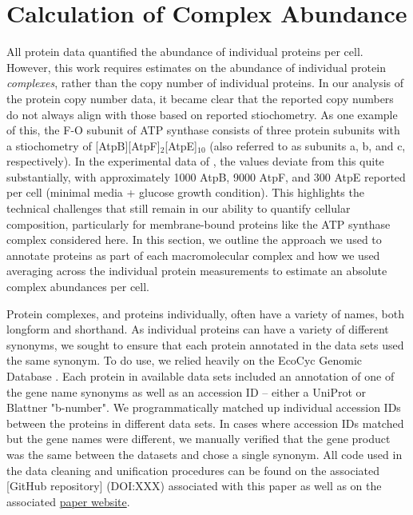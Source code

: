 \section{Calculation of Complex Abundance}

All protein data quantified the abundance of individual proteins per cell.
However, this work requires estimates on the abundance of individual protein
\textit{complexes}, rather than the copy number of individual proteins. In our
analysis of the protein copy number data, it became clear that the reported copy
numbers do not always align with those based on reported stiochometry. As one
example of this, the F-O subunit of ATP synthase consists of three protein
subunits with a stiochometry of [AtpB][AtpF]$_2$[AtpE]$_{10}$ (also referred to
as subunits a, b, and c, respectively). In the experimental data of
\cite{schmidt2016}, the values deviate from this quite substantially, with
approximately 1000 AtpB, 9000 AtpF, and 300 AtpE reported per cell (minimal
media + glucose growth condition).  This highlights the technical challenges
that still remain in our ability to quantify cellular composition, particularly
for membrane-bound proteins like the ATP synthase complex considered here.  In
this section, we outline the approach we used to annotate proteins as part of
each macromolecular complex and how we used averaging across the individual
protein measurements to estimate an absolute complex abundances per cell.

Protein complexes, and proteins individually, often have a variety of names,
both longform and shorthand. As individual proteins can have a variety of
different synonyms, we sought to ensure that each protein annotated in the
data sets used the same synonym. To do use, we relied heavily on the EcoCyc
Genomic Database \citep{keseler2017}.  Each protein in available data sets
included an annotation of one of the gene name synonyms as well as an
accession ID -- either a UniProt or Blattner "b-number". We programmatically
matched up individual accession IDs between the proteins in different data sets.
In cases where accession IDs matched but the gene names were different, we
manually verified that the gene product was the same between the datasets and
chose a single synonym.  All code used  in the data cleaning and unification
procedures can be found on the associated
\href{https://github.com/rpgroup-pboc/growth_limits}[GitHub repository]
(DOI:XXX) associated with this paper as well as on the associated
\href{https://rpgroup.caltech.edu/growth_limits}{paper website}.


